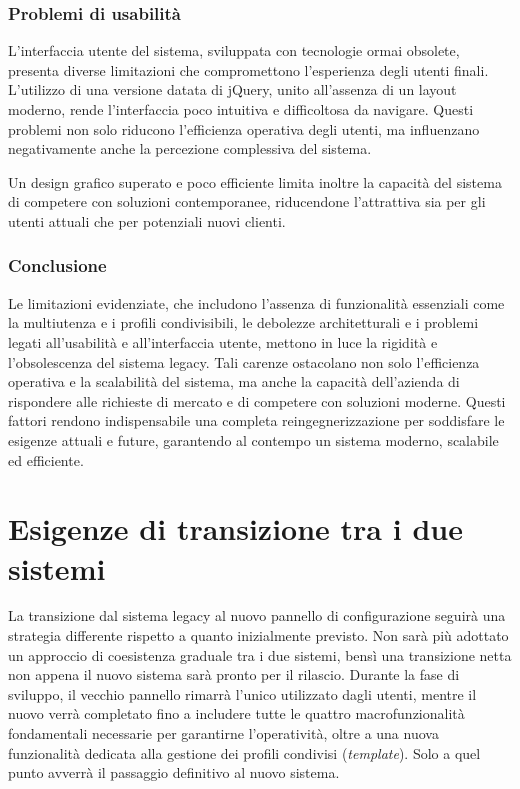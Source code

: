 \subsubsection{Problemi di usabilità}
L'interfaccia utente del sistema, sviluppata con tecnologie ormai obsolete, presenta diverse limitazioni che compromettono l’esperienza degli utenti finali. L’utilizzo di una versione datata di jQuery, unito all’assenza di un layout moderno, rende l’interfaccia poco intuitiva e difficoltosa da navigare. Questi problemi non solo riducono l’efficienza operativa degli utenti, ma influenzano negativamente anche la percezione complessiva del sistema.

Un design grafico superato e poco efficiente limita inoltre la capacità del sistema di competere con soluzioni contemporanee, riducendone l’attrattiva sia per gli utenti attuali che per potenziali nuovi clienti.

\subsubsection{Conclusione}
Le limitazioni evidenziate, che includono l’assenza di funzionalità essenziali come la multiutenza e i profili condivisibili, le debolezze architetturali e i problemi legati all’usabilità e all’interfaccia utente, mettono in luce la rigidità e l'obsolescenza del sistema legacy. Tali carenze ostacolano non solo l'efficienza operativa e la scalabilità del sistema, ma anche la capacità dell'azienda di rispondere alle richieste di mercato e di competere con soluzioni moderne. Questi fattori rendono indispensabile una completa reingegnerizzazione per soddisfare le esigenze attuali e future, garantendo al contempo un sistema moderno, scalabile ed efficiente.

\section{Esigenze di transizione tra i due sistemi}
La transizione dal sistema legacy al nuovo pannello di configurazione seguirà una strategia differente rispetto a quanto inizialmente previsto. Non sarà più adottato un approccio di coesistenza graduale tra i due sistemi, bensì una transizione netta non appena il nuovo sistema sarà pronto per il rilascio. Durante la fase di sviluppo, il vecchio pannello rimarrà l’unico utilizzato dagli utenti, mentre il nuovo verrà completato fino a includere tutte le quattro macrofunzionalità fondamentali necessarie per garantirne l’operatività, oltre a una nuova funzionalità dedicata alla gestione dei profili condivisi (\emph{template}). Solo a quel punto avverrà il passaggio definitivo al nuovo sistema.

